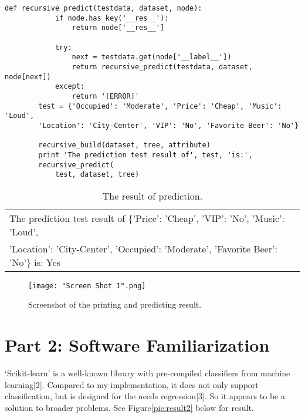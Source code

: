 \documentclass[12pt,letterpaper]{article}
\begin{document}
\begin{enumerate}
    \begin{table}[!t]
    \begin{lstlisting}[style=python]
        def recursive_predict(testdata, dataset, node):
            if node.has_key('__res__'):
                return node['__res__']

            try:
                next = testdata.get(node['__label__'])
                return recursive_predict(testdata, dataset, node[next])
            except:
                return '[ERROR]'
        test = {'Occupied': 'Moderate', 'Price': 'Cheap', 'Music': 'Loud',
        'Location': 'City-Center', 'VIP': 'No', 'Favorite Beer': 'No'}
    
        recursive_build(dataset, tree, attribute)
        print 'The prediction test result of', test, 'is:',
        recursive_predict(
            test, dataset, tree)
    \end{lstlisting}
    \end{table}

    \begin{table}[!t]
        \caption{The result of prediction.}
        \label{table:predict}
        \begin{center}
        \begin{tabular}{l}
            \hline
            The prediction test result of \{'Price': 'Cheap', 'VIP': 'No', 'Music': 'Loud', \\
            'Location': 'City-Center', 'Occupied': 'Moderate', 'Favorite Beer': 'No'\} is: Yes\\
            \hline
        \end{tabular}
        \end{center}
    \end{table}
    \begin{figure}[!t]
        \centering
        \texttt{[image: "Screen Shot 1".png]}
        \caption{Screenshot of the printing and predicting result.}
    \end{figure}
\end{enumerate}

\newpage
\section*{Part 2: Software Familiarization}

`Scikit-learn' is a well-known library with pre-compiled classifiers from machine learning[2]. Compared to my implementation, it does not only support classification, but is designed for the needs regression[3]. So it appears to be a solution to broader problems. See Figure\ref{pic:result2} below for result.
\end{document}
